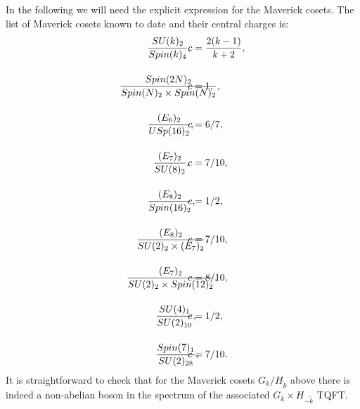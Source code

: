 \documentclass[11pt]{article}
\numberwithin{equation}{section}
\begin{document}
In the following we will need the explicit expression for the Maverick cosets. The list of Maverick cosets known to date \cite{ Pedrini:1999iy, Dunbar:1992gh, Dunbar:1993hr, Fuchs:1995tq} and their central charges is:
\begin{align}
    & \hspace{1.0cm} \frac{SU(k)_{2}}{Spin(k)_{4}}, && \hspace{-1.5cm} 
 c = \frac{2(k-1)}{k+2}, \label{firstmaverickfamily} \\[0.4cm]
    & \frac{Spin(2N)_{2}}{Spin(N)_{2} \times Spin(N)_{2}},   && \hspace{-1.5cm} c = 1, \label{secondmaverickfamily} \\[0.4cm]
    & \hspace{1.0cm}  \frac{(E_{6})_{2}}{USp(16)_{2}}, && \hspace{-1.5cm} c = 6/7, \label{thirdmaverick} \\[0.4cm] 
    & \hspace{1.2cm}  \frac{(E_{7})_{2}}{SU(8)_{2}}, && \hspace{-1.5cm} c = 7/10,  \label{fourthMaverick} \\[0.4cm] 
    & \hspace{1.0cm}  \frac{(E_{8})_{2}}{Spin(16)_{2}}, && \hspace{-1.5cm} \label{fifthMaverick} c = 1/2, \\[0.4cm]
    & \hspace{0.6cm}  \frac{(E_{8})_{2}}{SU(2)_{2} \times (E_{7})_{2}}, && \hspace{-1.5cm} c = 7/10,  \label{sixthMaverick} \\[0.4cm]
    & \hspace{0.25cm}  \frac{(E_{7})_{2}}{SU(2)_{2} \times Spin(12)_{2}}, && \hspace{-1.5cm} c = 8/10,  \\[0.4cm]
    & \hspace{1.3cm}  \frac{SU(4)_{1}}{SU(2)_{10}}, && \hspace{-1.5cm} c = 1/2,
     \\[0.4cm]
    & \hspace{1.3cm}  \frac{Spin(7)_{1}}{SU(2)_{28}}, && \hspace{-1.5cm} c = 7/10.\label{lastmaverick}
\end{align}
It is straightforward to check that for the Maverick cosets $G_{k} / H_{\tilde{k}}$ above there is indeed a non-abelian boson in the spectrum of the associated $G_{k} \times H_{-\tilde{k}}$ TQFT.
\end{document}
